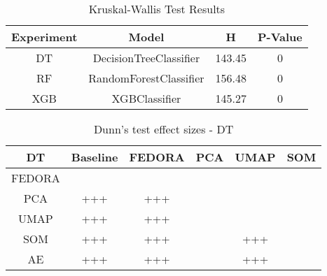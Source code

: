 {\begin{table}[h!]
    \centering
    \caption{Kruskal-Wallis Test Results}
    \label{table:kruskal}
    \begin{tabular}{|c|c|c|c|}
        \hline
         Experiment    & Model                  &   H &   P-Value \\
        \hline
         DT  & DecisionTreeClassifier &          143.45 &         0 \\
         RF  & RandomForestClassifier &          156.48 &         0 \\
         XGB & XGBClassifier          &          145.27 &         0 \\
        \hline
    \end{tabular}
\end{table}

\begin{table}[h!]
\centering
\caption{Dunn's test effect sizes - DT}
\label{table:dunn-dt_200_100}
    \begin{tabular}{|c|c|c|c|c|c|}
        \hline
         DT       & Baseline   & FEDORA           & PCA              & UMAP             & SOM              \\
        \hline
         FEDORA   &            & \cellcolor{gray} & \cellcolor{gray} & \cellcolor{gray} & \cellcolor{gray} \\
         PCA      & +++        & +++              & \cellcolor{gray} & \cellcolor{gray} & \cellcolor{gray} \\
         UMAP     & +++        & +++              &                  & \cellcolor{gray} & \cellcolor{gray} \\
         SOM      & +++        & +++              &                  & +++              & \cellcolor{gray} \\
         AE       & +++        & +++              &                  & +++              &                  \\
        \hline
    \end{tabular}
\end{table}


}

